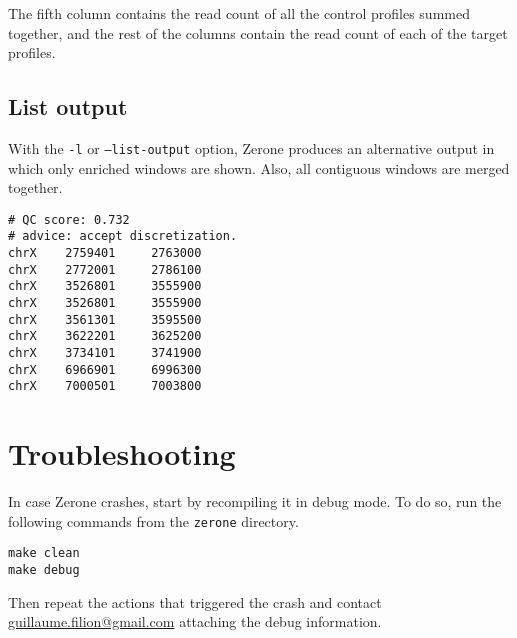 \documentclass[12pt]{article}
\begin{document}
The fifth column contains the read count of all the control profiles summed
together, and the rest of the columns contain the read count of each of the
target profiles.

\subsection{List output}

With the \texttt{-l} or \texttt{--list-output} option, Zerone produces an
alternative output in which only enriched windows are shown. Also, all
contiguous windows are merged together.

\begin{verbatim}
# QC score: 0.732
# advice: accept discretization.
chrX    2759401     2763000
chrX    2772001     2786100
chrX    3526801     3555900
chrX    3526801     3555900
chrX    3561301     3595500
chrX    3622201     3625200
chrX    3734101     3741900
chrX    6966901     6996300
chrX    7000501     7003800
\end{verbatim}

\pagebreak

\section{Troubleshooting}

In case Zerone crashes, start by recompiling it in debug mode. To do so,
run the following commands from the \texttt{zerone} directory.

\begin{verbatim}
make clean
make debug
\end{verbatim}

Then repeat the actions that triggered the crash and contact
\href{mailto:guillaume.filion@gmail.com}{guillaume.filion@gmail.com}
attaching the debug information.

\end{document}
